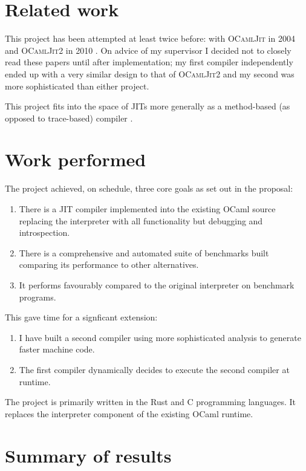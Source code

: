 \section{Related work}

This project has been attempted at least twice before: with \textsc{OCamlJit} in 2004 \cite{ocjit1}
and \textsc{OCamlJit2} in 2010 \cite{ocjit2}. On advice of my supervisor I decided not to closely
read these papers until after implementation; my first compiler independently ended up with a very
similar design to that of \textsc{OCamlJit2} and my second was more sophisticated than either
project.

This project fits into the space of JITs more generally as a method-based (as opposed to
trace-based) compiler \cite{pyket}.

\section{Work performed}

The project achieved, on schedule, three core goals as set out in the proposal:

\begin{enumerate}
      \item There is a JIT compiler implemented into the existing OCaml source
            replacing the interpreter with all functionality but debugging
            and introspection.
      \item There is a comprehensive and automated suite of benchmarks built
            comparing its performance to other alternatives.
      \item It performs favourably compared to the original interpreter on benchmark programs.
\end{enumerate}

This gave time for a signficant extension:

\begin{enumerate}
      \item I have built a second compiler using more sophisticated analysis to generate faster
            machine code.
      \item The first compiler dynamically decides to execute the second compiler at runtime.
\end{enumerate}

The project is primarily written in the Rust and C programming languages. It replaces the
interpreter component of the existing OCaml runtime.

\section{Summary of results}

